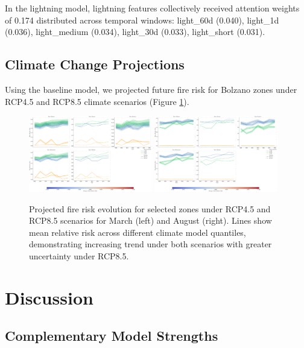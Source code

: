 \documentclass[11pt,a4paper]{article}
\begin{document}
In the lightning model, lightning features collectively received attention weights of 0.174 distributed across temporal windows: light\_60d (0.040), light\_1d (0.036), light\_medium (0.034), light\_30d (0.033), light\_short (0.031).

\subsection{Climate Change Projections}

Using the baseline model, we projected future fire risk for Bolzano zones under RCP4.5 and RCP8.5 climate scenarios (Figure \ref{fig:climate_projections}).

\begin{figure}[H]
\centering
\includegraphics[width=0.48\textwidth]{../output/figures/climate_projection_plot_march.png}
\hfill
\includegraphics[width=0.48\textwidth]{../output/figures/climate_projection_plot_august.png}
\caption{Projected fire risk evolution for selected zones under RCP4.5 and RCP8.5 scenarios for March (left) and August (right). Lines show mean relative risk across different climate model quantiles, demonstrating increasing trend under both scenarios with greater uncertainty under RCP8.5.}
\label{fig:climate_projections}
\end{figure}

\section{Discussion}

\subsection{Complementary Model Strengths}
\end{document}
